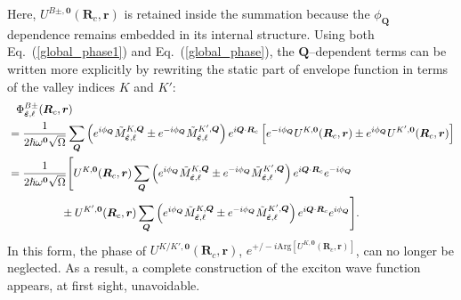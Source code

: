 Here, $U^{B\pm ,\boldsymbol{0}} (\boldsymbol{R}_c,\boldsymbol{r})$ is retained inside the summation because the $\phi_{\boldsymbol{Q}}$ dependence remains embedded in its internal structure. Using both Eq.~(\ref{global_phase1}) and Eq.~(\ref{global_phase}), the $\boldsymbol{Q}$--dependent terms can be written more explicitly by rewriting the static part of envelope function in terms of the valley indices $K$ and $K'$:
\begin{equation}
\begin{aligned}
& \hspace{0.75em} \Phi^{B\pm}_{\hat{\boldsymbol{\varepsilon}}, \ell}(\boldsymbol{R}_c, \boldsymbol{r})\\
&= \frac{1}{2 \hslash \omega^{\boldsymbol{0}} \sqrt{\Omega}}
\sum_{\boldsymbol{Q}}
\left( e^{i\phi_{\boldsymbol{Q}}} \tilde{M}_{\hat{\boldsymbol{\varepsilon}}, \ell}^{K,\boldsymbol{Q}}
\pm
e^{-i\phi_{\boldsymbol{Q}}} \tilde{M}_{\hat{\boldsymbol{\varepsilon}}, \ell}^{K',\boldsymbol{Q}}  \right)
e^{i\boldsymbol{Q}\cdot\boldsymbol{R}_c}
\left[ e^{-i\phi_{\boldsymbol{Q}}} U^{K ,\boldsymbol{0}} (\boldsymbol{R}_c,\boldsymbol{r})
\pm 
e^{i\phi_{\boldsymbol{Q}}} U^{K' ,\boldsymbol{0}} (\boldsymbol{R}_c,\boldsymbol{r}) \right] \\
&=\frac{1}{2 \hslash \omega^{\boldsymbol{0}} \sqrt{\Omega}}
\Bigg[
U^{K ,\boldsymbol{0}} (\boldsymbol{R}_c,\boldsymbol{r})
\sum_{\boldsymbol{Q}}
\left( e^{i\phi_{\boldsymbol{Q}}} \tilde{M}_{\hat{\boldsymbol{\varepsilon}}, \ell}^{K,\boldsymbol{Q}} 
\pm
e^{-i\phi_{\boldsymbol{Q}}} \tilde{M}_{\hat{\boldsymbol{\varepsilon}}, \ell}^{K',\boldsymbol{Q}} \right)
e^{i\boldsymbol{Q}\cdot\boldsymbol{R}_c} e^{-i\phi_{\boldsymbol{Q}}} \\
& \hspace{4.8em} \pm
U^{K' ,\boldsymbol{0}} (\boldsymbol{R}_c,\boldsymbol{r})
\sum_{\boldsymbol{Q}}
\left( e^{i\phi_{\boldsymbol{Q}}} \tilde{M}_{\hat{\boldsymbol{\varepsilon}}, \ell}^{K,\boldsymbol{Q}} 
\pm
e^{-i\phi_{\boldsymbol{Q}}} \tilde{M}_{\hat{\boldsymbol{\varepsilon}}, \ell}^{K',\boldsymbol{Q}} \right)
e^{i\boldsymbol{Q}\cdot\boldsymbol{R}_c} e^{i\phi_{\boldsymbol{Q}}}
\Bigg].
\end{aligned}
\label{mixed_phase}
\end{equation}
In this form, the phase of $U^{K/K' ,\boldsymbol{0}} (\boldsymbol{R}_c,\boldsymbol{r})$, $e^{{+}\!/\!{-}i \mathrm{Arg}\!\left[U^{K ,\boldsymbol{0}} (\boldsymbol{R}_c,\boldsymbol{r})\right]}$, can no longer be neglected. As a result, a complete construction of the exciton wave function appears, at first sight, unavoidable. 

